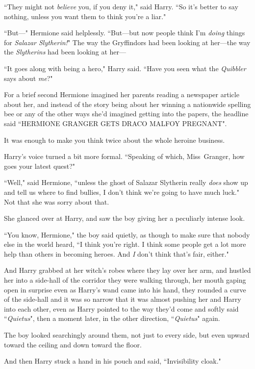 ``They might not \emph{believe} you, if you deny it," said Harry. ``So it's better to say nothing, unless you want them to think you're a liar."

``But—" Hermione said helplessly. ``But—but now people think I'm \emph{doing} things for \emph{Salazar Slytherin!}" The way the Gryffindors had been looking at her—the way the \emph{Slytherins} had been looking at her—

``It goes along with being a hero," Harry said. ``Have you seen what the \emph{Quibbler} says about \emph{me}?"

For a brief second Hermione imagined her parents reading a newspaper article about her, and instead of the story being about her winning a nationwide spelling bee or any of the other ways she'd imagined getting into the papers, the headline said ``HERMIONE GRANGER GETS DRACO MALFOY PREGNANT".

It was enough to make you think twice about the whole heroine business.

Harry's voice turned a bit more formal. ``Speaking of which, Miss~Granger, how goes your latest quest?"

``Well," said Hermione, ``unless the ghost of Salazar Slytherin really \emph{does} show up and tell us where to find bullies, I don't think we're going to have much luck." Not that she was sorry about that.

She glanced over at Harry, and saw the boy giving her a peculiarly intense look.

``You know, Hermione," the boy said quietly, as though to make sure that nobody else in the world heard, ``I think you're right. I think some people get a lot more help than others in becoming heroes. And \emph{I} don't think that's fair, either."

And Harry grabbed at her witch's robes where they lay over her arm, and hustled her into a side-hall of the corridor they were walking through, her mouth gaping open in surprise even as Harry's wand came into his hand, they rounded a curve of the side-hall and it was so narrow that it was almost pushing her and Harry into each other, even as Harry pointed to the way they'd come and softly said ``\emph{Quietus}", then a moment later, in the other direction, ``\emph{Quietus}" again.

The boy looked searchingly around them, not just to every side, but even upward toward the ceiling and down toward the floor.

And then Harry stuck a hand in his pouch and said, ``Invisibility cloak."

